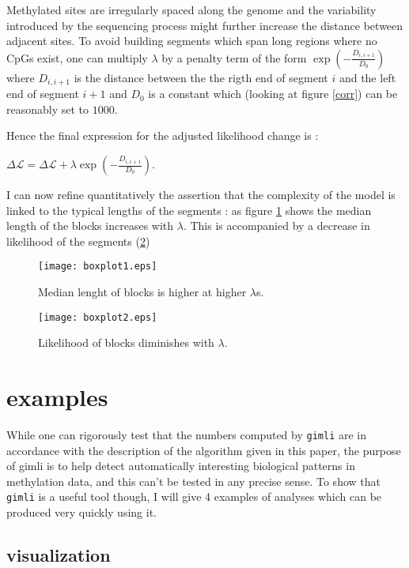 \documentclass[11pt]{amsart}
\newcommand{\lik}{\ensuremath{\mathcal{L}}}
\newcommand{\gimli}{\texttt{gimli} }
\begin{document}
Methylated sites are irregularly spaced along the genome and the variability 
introduced by the sequencing process might further increase the distance 
between adjacent sites.
To avoid building segments which span long regions where no CpGs exist, one 
can multiply $\lambda$ by a penalty term of the
form $\exp(-\frac{D_{i,i+1}}{D_0})$ where $D_{i,i+1}$ is the distance 
between the the rigth end of segment $i$ and the left end of segment $i+1$ and 
$D_0$ is a constant which (looking at figure \ref{corr}) can be reasonably 
set to $1000$. 

Hence the final expression for the adjusted likelihood change is :

$\Delta \lik = \Delta \lik+\lambda \exp(-\frac{D_{i,i+1}}{D_0}) $.

I can now refine quantitatively the assertion that the complexity of the model
is linked to the typical lengths of the segments : as figure \ref{boxplot1} 
shows the median length of the blocks increases with $\lambda$. This is 
accompanied by a decrease in likelihood of the segments (\ref{boxplot2})

\begin{figure}\label{boxplot1}
\texttt{[image: boxplot1.eps]}
\caption{Median lenght of blocks is higher at higher $\lambda$s.}
\end{figure}

\begin{figure}\label{boxplot2}
\texttt{[image: boxplot2.eps]}
\caption{Likelihood of blocks diminishes with $\lambda$.}
\end{figure}


\section{examples}

While one can rigorously test that the numbers computed by \gimli are in 
accordance with the description
of the algorithm given in this paper, the purpose of gimli is to help 
detect automatically interesting
biological patterns in methylation data, and this can't be tested in any 
precise sense. To show that \gimli is a useful tool
though, I will give 4 examples of analyses which can be produced very quickly
using it. 

\subsection{visualization}
\end{document}
